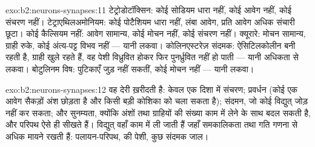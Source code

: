 \begin{solution}{exo:b2:neurons-synapses:11}
टेट्रोडोटॉक्सिन: कोई सोडियम धारा नहीं, कोई आवेग नहीं, कोई संचरण नहीं।
टेट्राएथिलअमोनियम: कोई पोटैशियम धारा नहीं, लंबा आवेग, प्रति आवेग अधिक
संचारी छूटा। कोई कैल्सियम नहीं: आवेग सामान्य,
कोई मोचन नहीं, कोई संचरण नहीं। क्यूरारे: मोचन सामान्य, ग्राही
रुके, कोई अंत्य-पट्ट विभव नहीं --- यानी लकवा। कोलिनएस्टरेज़
संदमक: ऐसिटिलकोलीन बनी रहती है, ग्राही खुले रहते हैं, वह पेशी
विध्रुवित होकर फिर पुनर्ध्रुवित नहीं हो पाती --- यानी अधिकता से लकवा।
बोटुलिनम विष: पुटिकाएँ जुड़ नहीं सकतीं, कोई मोचन नहीं --- यानी लकवा।
\end{solution}

\begin{solution}{exo:b2:neurons-synapses:12}
वह देरी ख़रीदती है: केवल एक दिशा में संचरण; प्रवर्धन
(कोई एक आवेग सैकड़ों अंश छोड़ता है और किसी बड़ी कोशिका को चला सकता
है); संदमन, जो कोई विद्युत् जोड़ नहीं कर सकता;
और सुनम्यता, क्योंकि अंशों तथा ग्राहियों की संख्या काम में लेने के साथ बदल
सकती है, और परिपथ ऐसे ही सीखते हैं। विद्युत्  वहाँ काम में ली जाती हैं
जहाँ समकालिकता तथा गति गणना से अधिक मायने रखती हैं:
पलायन-परिपथ,  की पेशी, कुछ संदमक जाल।
\end{solution}

